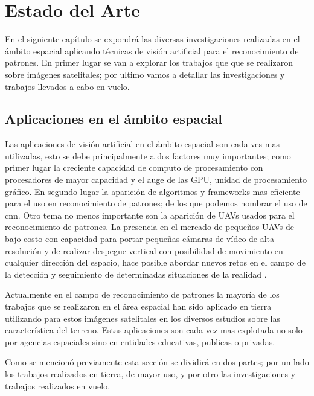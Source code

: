 \chapter{Estado del Arte} \label{chap:estadodelarte}
En el siguiente capítulo se  expondrá las diversas investigaciones realizadas en el ámbito espacial aplicando técnicas de visión artificial para el reconocimiento de patrones. En primer lugar se van a explorar los trabajos que que se realizaron sobre imágenes  satelitales; por ultimo vamos a detallar las investigaciones y trabajos llevados a cabo en vuelo.

\section{Aplicaciones en el ámbito espacial}\label{sec:estadodelacuestion}

Las aplicaciones de visión artificial en el ámbito espacial son cada ves mas utilizadas, esto se debe principalmente a dos factores muy importantes; como primer lugar la creciente capacidad de computo de procesamiento con procesadores de mayor capacidad y el auge de las GPU, unidad de procesamiento gráfico. En segundo lugar la aparición de algoritmos y frameworks mas eficiente para el uso en reconocimiento de patrones; de los que podemos nombrar el uso de \ac{cnn}. Otro tema no menos importante son la aparición de UAVs usados para el reconocimiento de patrones. La presencia en el mercado de pequeños UAVs de bajo costo con capacidad para portar pequeñas cámaras de vídeo de alta resolución y de realizar despegue vertical con posibilidad de 
movimiento en cualquier dirección del espacio, hace posible abordar nuevos retos en el campo de la detección y seguimiento de determinadas situaciones de la realidad \citep{Lanillos}.

Actualmente en el campo de reconocimiento de patrones la mayoría de los trabajos que se realizaron en el área espacial han sido aplicado en tierra utilizando para estos imágenes satelitales en los diversos estudios sobre las característica del terreno. Estas aplicaciones son cada vez mas explotada no solo por agencias espaciales sino en entidades educativas, publicas o privadas. 

Como se mencionó previamente esta sección se dividirá en dos partes; por un lado los trabajos realizados en tierra, de mayor uso, y por otro las investigaciones y trabajos realizados en vuelo.

